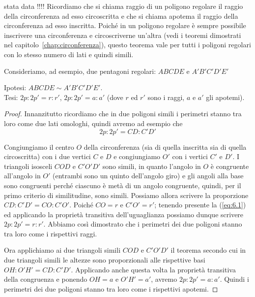 stata data !!!!
Ricordiamo che si chiama raggio di un poligono regolare il raggio 
della circonferenza ad esso circoscritta e che si chiama apotema il 
raggio della circonferenza ad esso inscritta. Poiché in un poligono 
regolare è sempre possibile inscrivere una circonferenza e 
circoscriverne un'altra (vedi i teoremi dimostrati nel 
capitolo~\ref{chap:circonferenza}), questo teorema vale per tutti i 
poligoni regolari con lo stesso numero di lati e quindi simili.

Consideriamo, ad esempio, due pentagoni regolari: $ABCDE$ e 
$A'B'C'D'E'$

\noindent Ipotesi: $ABCDE\sim A'B'C'D'E'$.\\
Tesi: $2p : 2p' = r : r'$, $2p : 2p' = a : a'$ (dove $r$ ed $r'$ sono 
i raggi, $a$ e $a'$ gli apotemi).

\begin{figure*}[!htb]
	\centering
\end{figure*}

\begin{proof}
Innanzitutto ricordiamo che in due poligoni simili i perimetri stanno 
tra loro come due lati omologhi, quindi avremo ad esempio che
\begin{equation}\label{eq:6.1}
2p : 2p' = CD : C'D'
\end{equation}

Congiungiamo il centro $O$ della circonferenza (sia di quella 
inscritta sia di quella circoscritta) con i due vertici $C$ e $D$ e 
congiungiamo $O'$ con i vertici $C'$ e $D'$. I triangoli isosceli 
$COD$ e $C'O'D'$ sono simili, in quanto l'angolo in $O$ è congruente 
all'angolo in $O'$ (entrambi sono un quinto dell'angolo giro) e gli 
angoli alla base sono congruenti perché ciascuno è metà di un angolo 
congruente, quindi, per il primo criterio di similitudine, sono 
simili. Possiamo allora scrivere la proporzione $CD : C'D' = CO : 
C'O'$.
Poiché $CO = r$ e $C'O' = r'$; tenendo presente la (\ref{eq:6.1}) ed 
applicando la proprietà transitiva dell'uguaglianza possiamo dunque 
scrivere $2p : 2p' = r : r'$. Abbiamo così dimostrato che i perimetri 
dei due poligoni stanno tra loro come i rispettivi raggi.

Ora applichiamo ai due triangoli simili $COD$ e $C'O'D'$ il teorema 
secondo cui in due triangoli simili le altezze sono proporzionali 
alle rispettive basi $OH : O'H' = CD : C'D'$. Applicando anche questa 
volta la proprietà transitiva della congruenza e ponendo $OH = a$ e 
$O'H' =a'$, avremo $2p : 2p' = a : a'$.
Quindi i perimetri dei due poligoni stanno tra loro come i rispettivi 
apotemi.
\end{proof}

